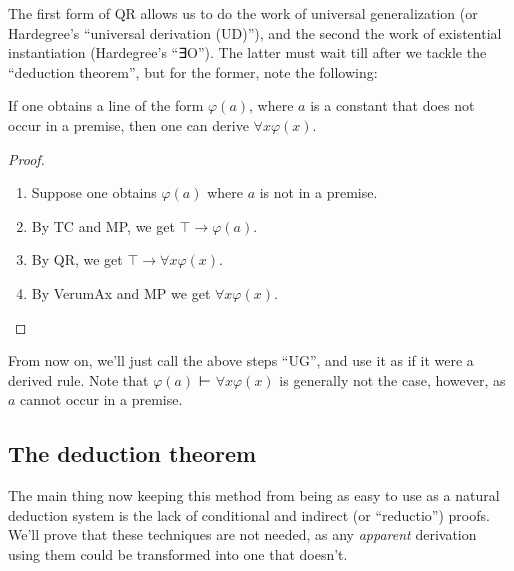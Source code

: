 \documentclass[12pt]{report}
\theoremstyle{nonumberplain}
\newtheorem{proof}{Proof}
\begin{document}
\medskip\noindent The first form of QR allows us to do the work of universal generalization (or Hardegree's ``universal derivation (UD)''), and the second the work of existential instantiation (Hardegree's ``∃O''). The latter must wait till after we tackle the ``deduction theorem'', but for the former, note the following:

\begin{mt}[UG]
If one obtains a line of the form $φ(a)$, where $a$ is a constant that does not occur in a premise, then one can derive $∀xφ(x)$.
\end{mt}
\begin{proof}
\begin{enumerate}
\item Suppose one obtains $φ(a)$ where $a$ is not in a premise.
\item By TC and MP, we get $⊤ → φ(a)$.
\item By QR, we get $⊤ → ∀xφ(x)$.
\item By VerumAx and MP we get $∀xφ(x)$.
\end{enumerate}
\end{proof}
From now on, we'll just call the above steps ``UG'', and use it as if it were a derived rule. Note that $φ(a)$ ⊢ $∀xφ(x)$ is generally not the case, however, as $a$ cannot occur in a premise.

\subsection*{The deduction theorem}

The main thing now keeping this method from being as easy to use as a natural deduction system is the lack of conditional and indirect (or ``reductio'') proofs. We'll prove that these techniques are not needed, as any \emph{apparent} derivation using them could be transformed into one that doesn't.
\end{document}
